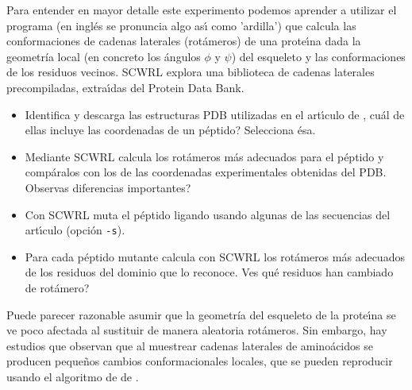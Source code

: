 
Para entender en mayor detalle este experimento podemos aprender a utilizar el programa 
 \citep{Bower1997}   
(en ingl\'{e}s se pronuncia algo as\'\i{} como 'ardilla') 
que calcula las conformaciones de cadenas laterales (rot\'{a}meros) de una prote\'\i{}na dada la geometr\'{i}a 
local (en concreto los \'{a}ngulos $\phi$ y $\psi$) del esqueleto y las conformaciones de los residuos vecinos.
SCWRL explora una biblioteca de cadenas laterales precompiladas, extra\'\i{}das del Protein Data Bank.

\begin{itemize}

\item Identifica y descarga las estructuras PDB utilizadas en el art\'\i{}culo de \citet{Reina2002},
cu\'{a}l de ellas incluye las coordenadas de un p\'{e}ptido? Selecciona \'{e}sa.

\item Mediante SCWRL calcula los rot\'{a}meros m\'{a}s adecuados para el p\'{e}ptido y comp\'{a}ralos con
los de las coordenadas experimentales obtenidas del PDB. Observas diferencias importantes?

\item Con SCWRL muta el p\'{e}ptido ligando usando algunas de las secuencias del art\'\i{}culo (opci\'{o}n \verb+-s+).

\item Para cada p\'{e}ptido mutante calcula con SCWRL los rot\'{a}meros m\'{a}s
adecuados de los residuos del dominio  
que lo reconoce. Ves qu\'{e} residuos han cambiado de rot\'{a}mero?

\end{itemize}

Puede parecer razonable asumir que la geometr\'{i}a del esqueleto de la prote\'\i{}na se ve poco afectada al sustituir de manera 
aleatoria rot\'{a}meros. Sin embargo, hay estudios que observan que al muestrear cadenas laterales de 
amino\'{a}cidos se producen peque\~nos cambios conformacionales locales, que se pueden reproducir 
usando el algoritmo de  de \citet{Davis2006}.

